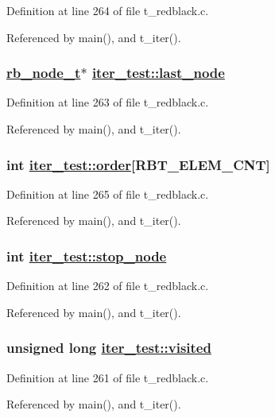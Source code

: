Definition at line 264 of file t\_\-redblack.c.

Referenced by main(), and t\_\-iter().\hypertarget{structiter__test_o2}{
\subsubsection[last\_\-node]{\setlength{\rightskip}{0pt plus 5cm}\hyperlink{struct__rb__node__s}{rb\_\-node\_\-t}$\ast$ \hyperlink{structiter__test_o2}{iter\_\-test::last\_\-node}}}
\label{structiter__test_o2}




Definition at line 263 of file t\_\-redblack.c.

Referenced by main(), and t\_\-iter().\hypertarget{structiter__test_o4}{
\subsubsection[order]{\setlength{\rightskip}{0pt plus 5cm}int \hyperlink{structiter__test_o4}{iter\_\-test::order}\mbox{[}RBT\_\-ELEM\_\-CNT\mbox{]}}}
\label{structiter__test_o4}




Definition at line 265 of file t\_\-redblack.c.

Referenced by main(), and t\_\-iter().\hypertarget{structiter__test_o1}{
\subsubsection[stop\_\-node]{\setlength{\rightskip}{0pt plus 5cm}int \hyperlink{structiter__test_o1}{iter\_\-test::stop\_\-node}}}
\label{structiter__test_o1}




Definition at line 262 of file t\_\-redblack.c.

Referenced by main(), and t\_\-iter().\hypertarget{structiter__test_o0}{
\subsubsection[visited]{\setlength{\rightskip}{0pt plus 5cm}unsigned long \hyperlink{structiter__test_o0}{iter\_\-test::visited}}}
\label{structiter__test_o0}




Definition at line 261 of file t\_\-redblack.c.

Referenced by main(), and t\_\-iter().
